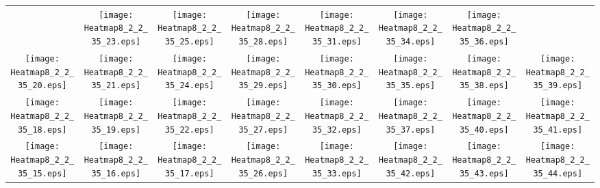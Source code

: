 \documentclass{standalone}
\begin{document}
\renewcommand{\arraystretch}{0}
\setlength{\tabcolsep}{0pt}
\begin{tabular}{ *8{c} }
 & \texttt{[image: Heatmap8\_2\_2\_35\_23.eps]} & \texttt{[image: Heatmap8\_2\_2\_35\_25.eps]} & \texttt{[image: Heatmap8\_2\_2\_35\_28.eps]} & \texttt{[image: Heatmap8\_2\_2\_35\_31.eps]} & \texttt{[image: Heatmap8\_2\_2\_35\_34.eps]} & \texttt{[image: Heatmap8\_2\_2\_35\_36.eps]} &  \\
\texttt{[image: Heatmap8\_2\_2\_35\_20.eps]} & \texttt{[image: Heatmap8\_2\_2\_35\_21.eps]} & \texttt{[image: Heatmap8\_2\_2\_35\_24.eps]} & \texttt{[image: Heatmap8\_2\_2\_35\_29.eps]} & \texttt{[image: Heatmap8\_2\_2\_35\_30.eps]} & \texttt{[image: Heatmap8\_2\_2\_35\_35.eps]} & \texttt{[image: Heatmap8\_2\_2\_35\_38.eps]} & \texttt{[image: Heatmap8\_2\_2\_35\_39.eps]} \\
\texttt{[image: Heatmap8\_2\_2\_35\_18.eps]} & \texttt{[image: Heatmap8\_2\_2\_35\_19.eps]} & \texttt{[image: Heatmap8\_2\_2\_35\_22.eps]} & \texttt{[image: Heatmap8\_2\_2\_35\_27.eps]} & \texttt{[image: Heatmap8\_2\_2\_35\_32.eps]} & \texttt{[image: Heatmap8\_2\_2\_35\_37.eps]} & \texttt{[image: Heatmap8\_2\_2\_35\_40.eps]} & \texttt{[image: Heatmap8\_2\_2\_35\_41.eps]} \\
\texttt{[image: Heatmap8\_2\_2\_35\_15.eps]} & \texttt{[image: Heatmap8\_2\_2\_35\_16.eps]} & \texttt{[image: Heatmap8\_2\_2\_35\_17.eps]} & \texttt{[image: Heatmap8\_2\_2\_35\_26.eps]} & \texttt{[image: Heatmap8\_2\_2\_35\_33.eps]} & \texttt{[image: Heatmap8\_2\_2\_35\_42.eps]} & \texttt{[image: Heatmap8\_2\_2\_35\_43.eps]} & \texttt{[image: Heatmap8\_2\_2\_35\_44.eps]} \\

\end{tabular}
\end{document}
